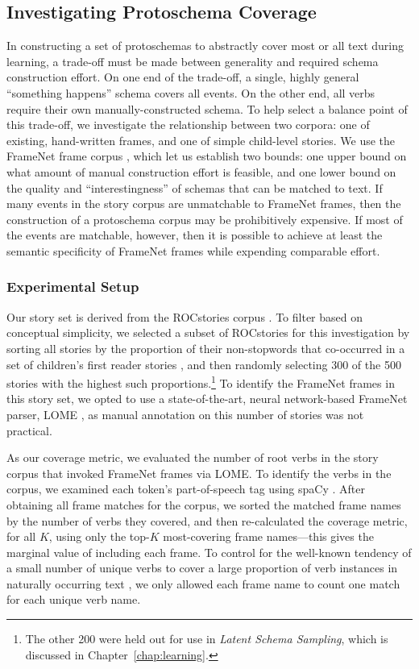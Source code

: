 \subsection{Investigating Protoschema Coverage}
In constructing a set of protoschemas to abstractly cover most or all text during learning, a trade-off must be made between generality and required schema construction effort. On one end of the trade-off, a single, highly general ``something happens'' schema covers all events. On the other end, all verbs require their own manually-constructed schema. To help select a balance point of this trade-off, we investigate the relationship between two corpora: one of existing, hand-written frames, and one of simple child-level stories. We use the FrameNet frame corpus \citep{framenet}, which let us establish two bounds: one upper bound on what amount of manual construction effort is feasible, and one lower bound on the quality and ``interestingness'' of schemas that can be matched to text.
If many events in the story corpus are unmatchable to FrameNet frames, then the construction of a protoschema corpus may be prohibitively expensive. If most of the events are matchable, however, then it is possible to achieve at least the semantic specificity of FrameNet frames while expending comparable effort.

\subsubsection{Experimental Setup}
Our story set is derived from the ROCstories corpus \citep{mostafazadeh-etal-2016-corpus}. To filter based on conceptual simplicity, we selected a subset of ROCstories for this investigation by sorting all stories by the proportion of their non-stopwords that co-occurred in a set of children's first reader stories \citep{mcguffey}, and then randomly selecting 300 of the 500 stories with the highest such proportions.\footnote{The other 200 were held out for use in \textit{Latent Schema Sampling}, which is discussed in Chapter~\ref{chap:learning}.} To identify the FrameNet frames in this story set, we opted to use a state-of-the-art, neural network-based FrameNet parser, LOME \citep{lome}, as manual annotation on this number of stories was not practical.

As our coverage metric, we evaluated the number of root verbs in the story corpus that invoked FrameNet frames via LOME. To identify the verbs in the corpus, we examined each token's part-of-speech tag using spaCy \citep{spacy2}. After obtaining all frame matches for the corpus, we sorted the matched frame names by the number of verbs they covered, and then re-calculated the coverage metric, for all $K$, using only the top-$K$ most-covering frame names---this gives the marginal value of including each frame. To control for the well-known tendency of a small number of unique verbs to cover a large proportion of verb instances in naturally occurring text \citep{zipf-nl}, we only allowed each frame name to count one match for each unique verb name.

